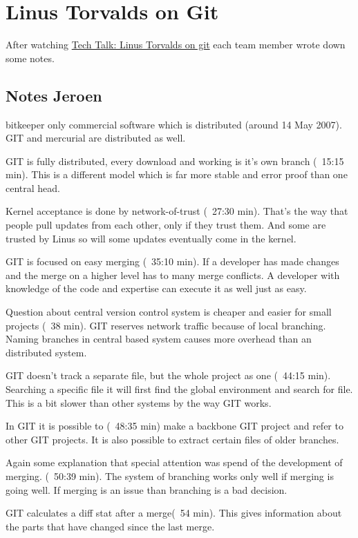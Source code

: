 \chapter{Linus Torvalds on Git}

After watching \href{https://www.youtube.com/watch?v=4XpnKHJAok8}{Tech Talk: Linus Torvalds on git} each team member wrote down some notes.

\section{Notes Jeroen}
bitkeeper only commercial software which is distributed (around 14 May 2007).
GIT and mercurial are distributed as well.

GIT is fully distributed, every download and working is it's own branch (~15:15 min).
This is a different model which is far more stable and error proof than one central head.

Kernel acceptance is done by network-of-trust (~27:30 min). That's the way that people pull 
updates from each other, only if they trust them. And some are trusted by Linus so will some 
updates eventually come in the kernel.

GIT is focused on easy merging (~35:10 min). If a developer has made changes and the merge 
on a higher level has to many merge conflicts. A developer with knowledge of the code and 
expertise can execute it as well just as easy. 

Question about central version control system is cheaper and easier for small projects 
(~38 min). GIT reserves network traffic because of local branching. Naming branches in central 
based system causes more overhead than an distributed system.

GIT doesn't track a separate file, but the whole project as one (~44:15 min). Searching a 
specific file it will first find the global environment and search for file. This is a bit 
slower than other systems by the way GIT works.

In GIT it is possible to (~48:35 min) make a backbone GIT project and refer to other GIT 
projects. It is also possible to extract certain files of older branches.

Again some explanation that special attention was spend of the development of merging.
(~50:39 min). The system of branching works only well if merging is going well. If merging 
is an issue than branching is a bad decision.

GIT calculates a diff stat after a merge(~54 min). This gives information about the parts 
that have changed since the last merge.

